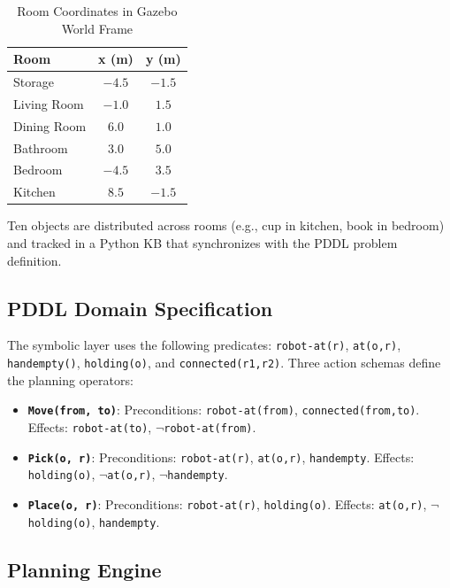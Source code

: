 \documentclass[conference]{IEEEtran}
\begin{document}
\begin{table}[H]
\centering
\caption{Room Coordinates in Gazebo World Frame}
\label{tab:rooms}
\begin{tabular}{lcc}
\toprule
\textbf{Room} & \textbf{x (m)} & \textbf{y (m)} \\
\midrule
Storage & $-4.5$ & $-1.5$ \\
Living Room & $-1.0$ & $1.5$ \\
Dining Room & $6.0$ & $1.0$ \\
Bathroom & $3.0$ & $5.0$ \\
Bedroom & $-4.5$ & $3.5$ \\
Kitchen & $8.5$ & $-1.5$ \\
\bottomrule
\end{tabular}
\end{table}

Ten objects are distributed across rooms (e.g., cup in kitchen, book in bedroom) and tracked in a Python KB that synchronizes with the PDDL problem definition.

\subsection{PDDL Domain Specification}

The symbolic layer uses the following predicates: \texttt{robot-at(r)}, \texttt{at(o,r)}, \texttt{handempty()}, \texttt{holding(o)}, and \texttt{connected(r1,r2)}. Three action schemas define the planning operators:

\begin{itemize}[nosep, leftmargin=1.5em]
\item \texttt{\textbf{Move(from, to)}}: Preconditions: \texttt{robot-at(from)}, \texttt{connected(from,to)}. Effects: \texttt{robot-at(to)}, $\neg$\texttt{robot-at(from)}.
\item \texttt{\textbf{Pick(o, r)}}: Preconditions: \texttt{robot-at(r)}, \texttt{at(o,r)}, \texttt{handempty}. Effects: \texttt{holding(o)}, $\neg$\texttt{at(o,r)}, $\neg$\texttt{handempty}.
\item \texttt{\textbf{Place(o, r)}}: Preconditions: \texttt{robot-at(r)}, \texttt{holding(o)}. Effects: \texttt{at(o,r)}, $\neg$\texttt{holding(o)}, \texttt{handempty}.
\end{itemize}

\subsection{Planning Engine}
\end{document}
